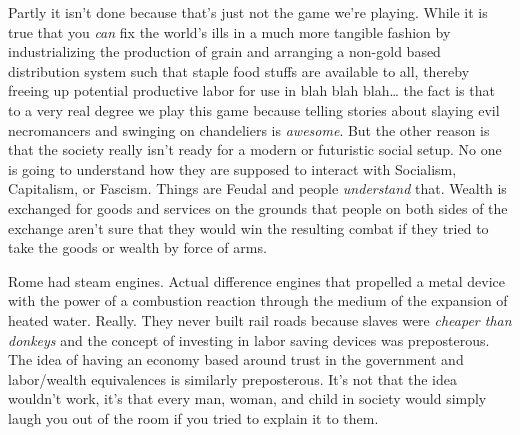 Partly it isn't done because that's just not the game we're playing. While it is true that you \textit{can} fix the world's ills in a much more tangible fashion by industrializing the production of grain and arranging a non-gold based distribution system such that staple food stuffs are available to all, thereby freeing up potential productive labor for use in blah blah blah\ldots{} the fact is that to a very real degree we play this game because telling stories about slaying evil necromancers and swinging on chandeliers is \textit{awesome}. But the other reason is that the society really isn't ready for a modern or futuristic social setup. No one is going to understand how they are supposed to interact with Socialism, Capitalism, or Fascism. Things are Feudal and people \textit{understand} that. Wealth is exchanged for goods and services on the grounds that people on both sides of the exchange aren't sure that they would win the resulting combat if they tried to take the goods or wealth by force of arms.

Rome had steam engines. Actual difference engines that propelled a metal device with the power of a combustion reaction through the medium of the expansion of heated water. Really. They never built rail roads because slaves were \textit{cheaper than donkeys} and the concept of investing in labor saving devices was preposterous. The idea of having an economy based around trust in the government and labor/wealth equivalences is similarly preposterous. It's not that the idea wouldn't work, it's that every man, woman, and child in society would simply laugh you out of the room if you tried to explain it to them. 
